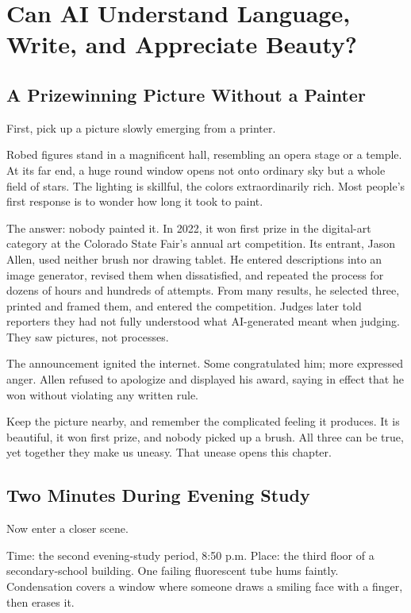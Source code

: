 \chapter[AI: Language, Writing, and Beauty]{Can AI Understand Language, Write, and Appreciate Beauty?}
\section{A Prizewinning Picture Without a Painter}
First, pick up a picture slowly emerging from a printer.

Robed figures stand in a magnificent hall, resembling an opera stage or a temple. At its far end, a huge round window opens not onto ordinary sky but a whole field of stars. The lighting is skillful, the colors extraordinarily rich. Most people's first response is to wonder how long it took to paint.

The answer: nobody painted it. In 2022, it won first prize in the digital-art category at the Colorado State Fair's annual art competition. Its entrant, Jason Allen, used neither brush nor drawing tablet. He entered descriptions into an image generator, revised them when dissatisfied, and repeated the process for dozens of hours and hundreds of attempts. From many results, he selected three, printed and framed them, and entered the competition. Judges later told reporters they had not fully understood what AI-generated meant when judging. They saw pictures, not processes.

The announcement ignited the internet. Some congratulated him; more expressed anger. Allen refused to apologize and displayed his award, saying in effect that he won without violating any written rule.

Keep the picture nearby, and remember the complicated feeling it produces. It is beautiful, it won first prize, and nobody picked up a brush. All three can be true, yet together they make us uneasy. That unease opens this chapter.

\section{Two Minutes During Evening Study}
Now enter a closer scene.

Time: the second evening-study period, 8:50 p.m. Place: the third floor of a secondary-school building. One failing fluorescent tube hums faintly. Condensation covers a window where someone draws a smiling face with a finger, then erases it.

